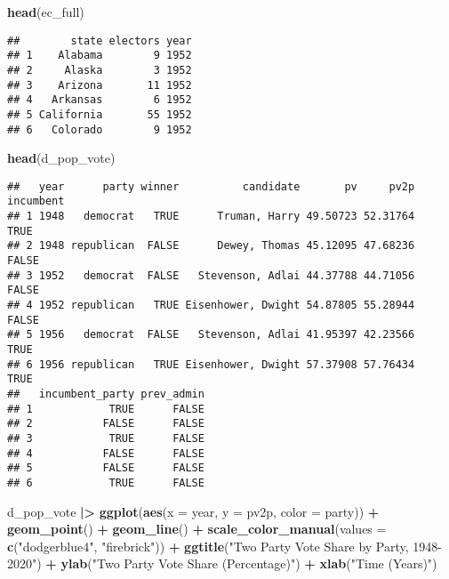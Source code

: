 \documentclass[
]{article}
\newenvironment{Shaded}{\begin{snugshade}}{\end{snugshade}}
\newcommand{\AttributeTok}[1]{\textcolor[rgb]{0.13,0.29,0.53}{#1}}
\newcommand{\FunctionTok}[1]{\textcolor[rgb]{0.13,0.29,0.53}{\textbf{#1}}}
\newcommand{\NormalTok}[1]{#1}
\newcommand{\SpecialCharTok}[1]{\textcolor[rgb]{0.81,0.36,0.00}{\textbf{#1}}}
\newcommand{\StringTok}[1]{\textcolor[rgb]{0.31,0.60,0.02}{#1}}
\begin{document}
\begin{Shaded}
\begin{Highlighting}[]
\FunctionTok{head}\NormalTok{(ec\_full)}
\end{Highlighting}
\end{Shaded}

\begin{verbatim}
##        state electors year
## 1    Alabama        9 1952
## 2     Alaska        3 1952
## 3    Arizona       11 1952
## 4   Arkansas        6 1952
## 5 California       55 1952
## 6   Colorado        9 1952
\end{verbatim}

\begin{Shaded}
\begin{Highlighting}[]
\FunctionTok{head}\NormalTok{(d\_pop\_vote)}
\end{Highlighting}
\end{Shaded}

\begin{verbatim}
##   year      party winner          candidate       pv     pv2p incumbent
## 1 1948   democrat   TRUE      Truman, Harry 49.50723 52.31764      TRUE
## 2 1948 republican  FALSE      Dewey, Thomas 45.12095 47.68236     FALSE
## 3 1952   democrat  FALSE   Stevenson, Adlai 44.37788 44.71056     FALSE
## 4 1952 republican   TRUE Eisenhower, Dwight 54.87805 55.28944     FALSE
## 5 1956   democrat  FALSE   Stevenson, Adlai 41.95397 42.23566      TRUE
## 6 1956 republican   TRUE Eisenhower, Dwight 57.37908 57.76434      TRUE
##   incumbent_party prev_admin
## 1            TRUE      FALSE
## 2           FALSE      FALSE
## 3            TRUE      FALSE
## 4           FALSE      FALSE
## 5           FALSE      FALSE
## 6            TRUE      FALSE
\end{verbatim}

\begin{Shaded}
\begin{Highlighting}[]
\NormalTok{d\_pop\_vote }\SpecialCharTok{|\textgreater{}}
  \FunctionTok{ggplot}\NormalTok{(}\FunctionTok{aes}\NormalTok{(}\AttributeTok{x =}\NormalTok{ year, }\AttributeTok{y =}\NormalTok{ pv2p, }\AttributeTok{color =}\NormalTok{ party)) }\SpecialCharTok{+}
  \FunctionTok{geom\_point}\NormalTok{() }\SpecialCharTok{+}
  \FunctionTok{geom\_line}\NormalTok{() }\SpecialCharTok{+}
  \FunctionTok{scale\_color\_manual}\NormalTok{(}\AttributeTok{values =} \FunctionTok{c}\NormalTok{(}\StringTok{"dodgerblue4"}\NormalTok{, }\StringTok{"firebrick"}\NormalTok{)) }\SpecialCharTok{+}
  \FunctionTok{ggtitle}\NormalTok{(}\StringTok{"Two Party Vote Share by Party, 1948{-}2020"}\NormalTok{) }\SpecialCharTok{+}
  \FunctionTok{ylab}\NormalTok{(}\StringTok{"Two Party Vote Share (Percentage)"}\NormalTok{) }\SpecialCharTok{+}
  \FunctionTok{xlab}\NormalTok{(}\StringTok{"Time (Years)"}\NormalTok{)}
\end{Highlighting}
\end{Shaded}
\end{document}
